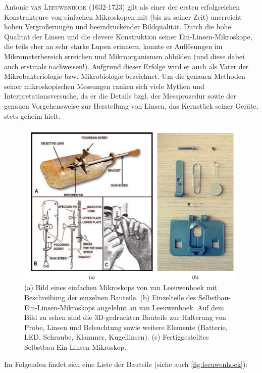 \documentclass[english, ngerman]{scrartcl}
\begin{document}
Antonie \textsc{van Leeuwenhoek} (1632-1723) gilt als einer der ersten erfolgreichen Konstrukteure von einfachen Mikroskopen mit (bis zu seiner Zeit) unerreicht hohen Vergrößerungen und beeindruckender Bildqualität. Durch die hohe Qualität der Linsen und die clevere Konstruktion seiner Ein-Linsen-Mikroskope, die teils eher an sehr starke Lupen erinnern, konnte er Auflösungen im Mikrometerbereich erreichen und Mikroorganismen abbilden (und diese dabei auch erstmals nachweisen!). Aufgrund dieser Erfolge wird er auch als Vater der Mikrobakteriologie bzw. Mikrobiologie bezeichnet. Um die genauen Methoden seiner mikroskopischen Messungen ranken sich viele Mythen und Interpretationsversuche, da er die Details bzgl. der Messprozedur sowie der genauen Vorgehensweise zur Herstellung von Linsen, das Kernstück seiner Geräte, stets geheim hielt.
%
\begin{figure}[H]
    \centering
    \begin{samepage}
        \includegraphics[width=\linewidth]{fig/Leeuwenhoek.png}
        \caption[Aufbau eines Van-Leeuwenhoek-Mikroskops]{(a) Bild eines einfachen Mikroskops von van Leeuwenhoek mit Beschreibung der einzelnen Bauteile. (b) Einzelteile des Selbstbau-Ein-Linsen-Mikroskops angelehnt an van Leeuwenhoek. Auf dem Bild zu sehen sind die 3D-gedruckten Bauteile zur Halterung von Probe, Linsen und Beleuchtung sowie weitere Elemente (Batterie, LED, Schraube, Klammer, Kugellinsen). (c) Fertiggestelltes Selbstbau-Ein-Linsen-Mikroskop.}
        \label{fig:leeuwenhoek}
    \end{samepage}
\end{figure}
%
Im Folgenden findet sich eine Liste der Bauteile (siehe auch \autoref{fig:leeuwenhoek}):
\end{document}
